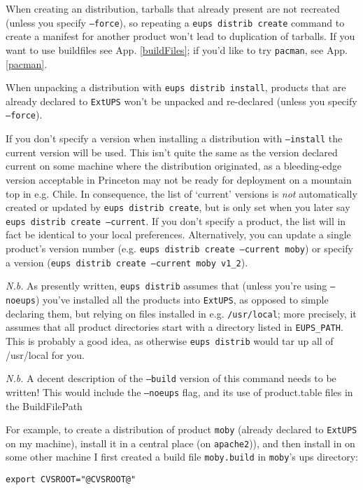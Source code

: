 \documentclass{article}
\newcommand{\code}[1]{\texttt{#1}}
\newcommand{\eups}{\code{ExtUPS}}
\newcommand{\pacman}{\code{pacman}}
\begin{document}
\begin{itemize}
When creating an distribution, tarballs that already present are not recreated
(unless you specify \code{--force}),
so repeating a \code{eups distrib create} command to create a manifest for another
product won't lead to duplication of tarballs.  If you want to use buildfiles
see App. \ref{buildFiles}; if you'd like to try \pacman{}, see App. \ref{pacman}.

When unpacking a distribution with \code{eups distrib install}, products that are
already declared to \eups{} won't be unpacked and re-declared (unless you specify \code{--force}).

If you don't specify a version when installing a distribution with
\code{--install} the current version will be used.  This isn't quite the same
as the version declared current on some machine where the distribution
originated, as a bleeding-edge version acceptable in Princeton may not
be ready for deployment on a mountain top in e.g. Chile. In
consequence, the list of `current' versions is \textit{not}
automatically created or updated by \code{eups distrib create}, but is
only set when you later say \code{eups distrib create --current}.  If you don't specify
a product, the list will in fact be identical to your local preferences.
Alternatively, you can update a single product's version number (e.g.
\code{eups distrib create --current moby}) or specify a version (\code{eups distrib create --current moby v1\_2}).

\textit{N.b.} As presently written, \code{eups distrib} assumes that (unless you're
using \code{--noeups}) you've
installed all the products into \eups, as opposed to simple declaring them, but
relying on files installed in e.g. \code{/usr/local}; more precisely, it assumes
that all product directories start with a directory listed in \code{EUPS\_PATH}.
This is probably a good idea, as otherwise \code{eups distrib} would tar up
all of /usr/local for you.  

\textit{N.b.} A decent description of the \code{--build} version of this command
needs to be written!  This would include the \code{--noeups} flag, and its use
of product.table files in the BuildFilePath

For example, to create a distribution of product \code{moby} (already declared
to \eups{} on my machine), install it in a central place (on \code{apache2})),
and then install in on some other machine I first created a build file
\code{moby.build} in \code{moby}'s ups directory:
\begin{verbatim}
export CVSROOT="@CVSROOT@"


\end{verbatim}
\end{itemize}
\end{document}
